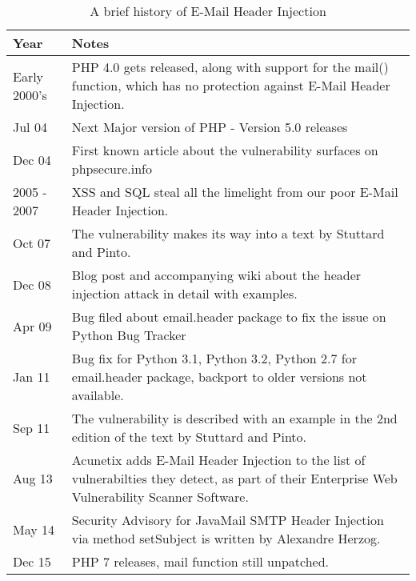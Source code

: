 \begin{table}[!htbp]
	\centering
	\begin{tabular}{|p{2cm}|p{12cm}|}
		\hline
		{Year} & { Notes}\\
		\hline

		{Early 2000's } & { PHP 4.0 gets released, along with support for the mail() function, which has no protection against E-Mail Header Injection.}\\
		\hline

		{Jul 04} & { Next Major version of PHP - Version 5.0 releases}\\
		\hline

		{Dec 04} & { First known article about the vulnerability surfaces on phpsecure.info}\\
		\hline

		{2005 - 2007} & {XSS and SQL steal all the limelight from our poor E-Mail Header Injection.}\\
		\hline

		{Oct 07} & {The vulnerability makes its way into a text by Stuttard and Pinto. }\\
		\hline

		{Dec 08} & {Blog post and accompanying wiki about the header injection attack in detail with examples.}\\
		\hline

		{Apr 09} & {Bug filed about email.header package to fix the issue on Python Bug Tracker}\\
		\hline

		{Jan 11} & {Bug fix for Python 3.1, Python 3.2, Python 2.7 for email.header package, backport to older versions not available.}\\
		\hline

		{Sep 11} & {The vulnerability is described with an example in the 2nd edition of the text by Stuttard and Pinto.}\\
		\hline

		{Aug 13} & {Acunetix adds E-Mail Header Injection to the list of vulnerabilties they detect, as part of their Enterprise Web Vulnerability Scanner Software.}\\
		\hline

		{May 14} & {Security Advisory for JavaMail SMTP Header Injection via method setSubject is written by Alexandre Herzog.}\\
		\hline

		{Dec 15}  & {PHP 7 releases, mail function still unpatched.}\\
		\hline
	\end{tabular}
	\caption{A brief history of E-Mail Header Injection}
	\label{tab:history}
\end{table}
